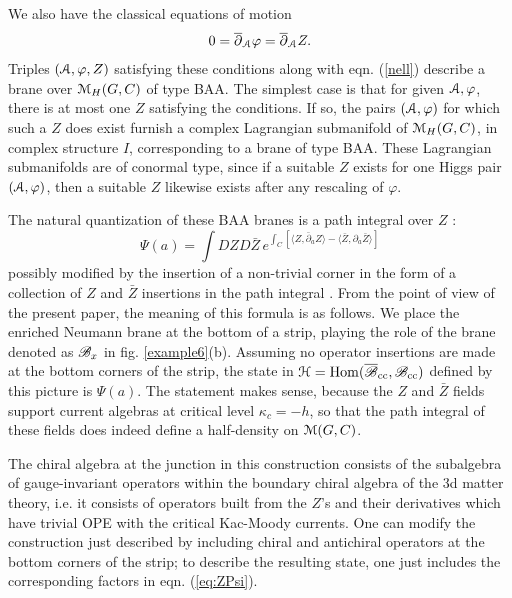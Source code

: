 \documentclass[11pt,a4paper]{article}
\begin{document}
We also have the classical equations of motion 
\begin{align}
0=\overline\partial_{\mathcal A}\varphi =\overline\partial_{\mathcal A} Z.
\end{align}
Triples $({\mathcal A},\varphi,Z)$ satisfying these conditions along with eqn. (\ref{nell}) describe a brane over ${\mathcal M}_H(G,C)$ of type BAA.   The simplest case is that for given ${\mathcal A},\varphi$, there is at most one $Z$ satisfying the conditions. If so, the pairs $({\mathcal A},\varphi)$ for which such a $Z$ does exist furnish a complex Lagrangian submanifold of ${\mathcal M}_H(G,C)$, in complex structure $I$, corresponding to a brane of type BAA.
These Lagrangian submanifolds are  of conormal type, since if a suitable $Z$ exists for one Higgs pair  $({\mathcal A},\varphi)$, then a suitable $Z$ likewise exists after any rescaling of $\varphi$.   

The natural quantization of these BAA branes is a path integral over $Z$ \cite{Gaiotto:2016wcv}:
\begin{equation}\label{eq:ZPsi}
\Psi(a) = \int DZ D\bar Z \,e^{\int_C \left[\langle Z, \bar \partial_a Z \rangle -  \langle 
\bar Z, \partial_a \bar Z \rangle\right]}
\end{equation} 
possibly modified by the insertion of a non-trivial corner in the form of a collection of $Z$ and $\bar Z$ insertions in the path integral \cite{Costello:2018fnz}. 
From the point of view of the present paper, the meaning of this formula is as follows.  We place the enriched Neumann brane at the bottom of a strip,
playing the role of the brane denoted as ${\mathscr B}_x$ in fig. \ref{example6}(b).    Assuming no operator insertions are made at the bottom corners  of the strip,
the state in ${\mathcal H}={\mathrm{Hom}}(\overline{{\mathscr B}}_{\mathrm{cc}},{\mathscr B}_{\mathrm{cc}})$ defined by this picture is $\Psi(a)$.   The statement makes sense, because the $Z$ and $\bar Z$ fields support
current algebras at critical level $\kappa_c=-h$, so that the path integral of these fields does indeed define a half-density on ${\mathcal M}(G,C)$.  

The chiral algebra at the junction in this construction consists of the 
subalgebra of gauge-invariant operators within the boundary chiral algebra of the 3d matter theory, i.e. it consists of operators built from the $Z$'s and their derivatives which have trivial OPE with the critical Kac-Moody currents.   One can modify the construction just described by including chiral and antichiral operators at the
bottom corners of the strip; to describe the resulting state, one just includes the corresponding factors in eqn. (\ref{eq:ZPsi}).
\end{document}

